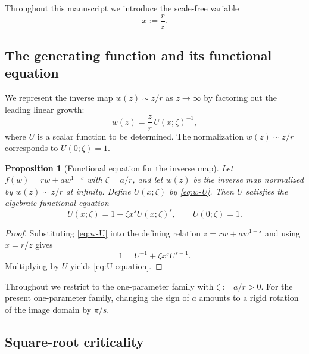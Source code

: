 \documentclass[11pt]{amsart}
\numberwithin{equation}{section}
\theoremstyle{plain}
\newtheorem{proposition}[theorem]{Proposition}
\theoremstyle{definition}
\theoremstyle{remark}
\begin{document}
Throughout this manuscript we introduce the scale-free variable
\begin{equation}\label{eq:x-def}
	x := \frac{r}{z}.
\end{equation}


\subsection{The generating function and its functional equation}
\label{subsec:generating-function}

We represent the inverse map $w(z) \sim z/r$ as $z \to \infty$ by factoring out
the leading linear growth:
\begin{equation}\label{eq:w-U}
	w(z) = \frac{z}{r} \, U(x;\zeta)^{-1},
\end{equation}
where $U$ is a scalar function to be determined. The normalization
$w(z) \sim z/r$ corresponds to $U(0;\zeta) = 1$.

\begin{proposition}[Functional equation for the inverse map]
	\label{prop:functional-eq}
	Let $f(w) = rw + aw^{1-s}$ with $\zeta = a/r$, and let $w(z)$ be the inverse
	map normalized by $w(z) \sim z/r$ at infinity. Define $U(x;\zeta)$ by
	\eqref{eq:w-U}. Then $U$ satisfies the algebraic functional equation
	\begin{equation}\label{eq:U-equation}
		U(x;\zeta) = 1 + \zeta x^s U(x;\zeta)^s, \qquad U(0;\zeta) = 1.
	\end{equation}
\end{proposition}

\begin{proof}
	Substituting \eqref{eq:w-U} into the defining relation $z = rw + aw^{1-s}$ and
	using $x = r/z$ gives
	\[
		1 = U^{-1} + \zeta x^s U^{s-1}.
	\]
	Multiplying by $U$ yields \eqref{eq:U-equation}.
\end{proof}

Throughout we restrict to the one-parameter family with $\zeta:=a/r>0$.
For the present one-parameter family, changing the sign of $a$ amounts to a
rigid rotation of the image domain by $\pi/s$.


\subsection{Square-root criticality}
\label{subsec:sqrt-critical}
\end{document}
